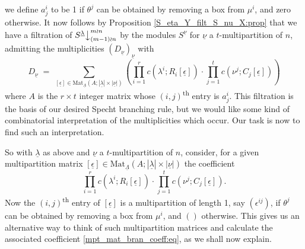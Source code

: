 \documentclass[10pt]{article}
\theoremstyle{definition}
\newcommand{\tss}[1]{\textsuperscript{#1}}
\newcommand{\ul}[1]{\underline{#1}}
\newcommand{\cDot}{\boldsymbol{\cdot}}
\begin{document}
we define $a^i_j$ to be 1 if $\theta^j$ can be obtained by removing a box from $\mu^i$, and zero otherwise.
It now follows by Proposition \ref{S_eta_Y_filt_S_nu_X:prop} that we have a filtration of
$S^{\ul{\lambda}}\bigr\downarrow^{m \wr n}_{(m-1) \wr n}$ by the modules $S^{\ul{\nu}}$ for $\ul{\nu}$ a $t$-multipartition of $n$, admitting the
multiplicities $(D_{\ul{\nu}})_{\ul{\nu}}$ with
\[
D_{\ul{\nu}} \; = \; \sum_{[\ul{\epsilon}] \in\mathrm{Mat}_{\ul{\Lambda}}(A;|\ul{\lambda}|\times|\ul{\nu}|)}
\left(\prod^r_{i=1}c(\lambda^i;R_i[\ul{\epsilon}])\:\cDot\:\prod^t_{j=1}c(\nu^j;C_j[\ul{\epsilon}])\right)
\]
where $A$ is the $r \times t$ integer matrix whose $(i,j)$\tss{th} entry is $a^i_j$. This filtration is the basis of our desired Specht
branching rule, but we would like some kind of combinatorial interpretation of the multiplicities which occur. Our task
is now to find such an interpretation.

So with $\ul{\lambda}$ as above and $\ul{\nu}$ a $t$-multipartition of $n$, consider, for a given multipartition
matrix
$[\ul{\epsilon}] \in \mathrm{Mat}_{\ul{\Lambda}}(A;|\ul{\lambda}|\times|\ul{\nu}|)$ the coefficient
\begin{equation}\label{mpt_mat_bran_coeff:eq}
\prod^r_{i=1}c(\lambda^i;R_i[\ul{\epsilon}])\:\cDot\:\prod^t_{j=1}c(\nu^j;C_j[\ul{\epsilon}]).
\end{equation}
Now the
$(i,j)$\tss{th} entry of $[\ul{\epsilon}]$ is a multipartition of length 1, say $(\epsilon^{ij})$, if $\theta^j$ can be obtained by
removing a box from $\mu^i$, and $()$ otherwise. This gives us an alternative way to think of such multipartition matrices and calculate
the associated coefficient \eqref{mpt_mat_bran_coeff:eq}, as we shall now explain.
\end{document}
